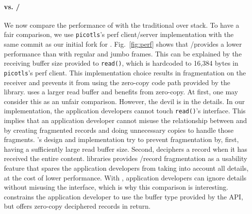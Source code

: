 \paragraph*{\tcpls vs. \tls/\tcp} We now compare the performance of \tcpls with
the traditional \tls over \tcp stack. To have a fair comparison, we use
\texttt{picotls}'s perf client/server implementation with the same commit as our
initial fork for \tcpls. Fig.~\ref{fig:perf} shows that \tls/\tcp provides a
lower performance than \tcpls with regular and jumbo frames. This can be
explained by the receiving buffer size provided to \texttt{read()}, which is
hardcoded to 16,384 bytes in \texttt{picotls}'s perf client. This implementation
choice results in fragmentation on the receiver and prevents it from using the
zero-copy code path provided by the library. \tcpls uses a larger read buffer
and benefits from zero-copy. At first, one may consider this as an unfair
comparison. However, the devil is in the details. In our \tcpls implementation,
the application developers cannot touch \texttt{read()}'s interface. This
implies that an application developer cannot misuse the relationship between
\tls and \tcp by creating fragmented records and doing unnecessary copies to
handle those fragments. \tcpls's design and implementation try to prevent
fragmentation by, first, having a sufficiently large read buffer size. Second,
\tcpls deciphers a record when it has received the entire content.
\tls libraries provides \tls/\tcp record fragmentation as a usability
feature that spares the application developers from taking into account all \tls
details, at the cost of lower performance. With \tcpls, application developers
can ignore \tls details without misusing the interface, which is why
this comparison is interesting. \tcpls constrains the application developer to
use the buffer type provided by the API, but offers zero-copy deciphered records
in return.


